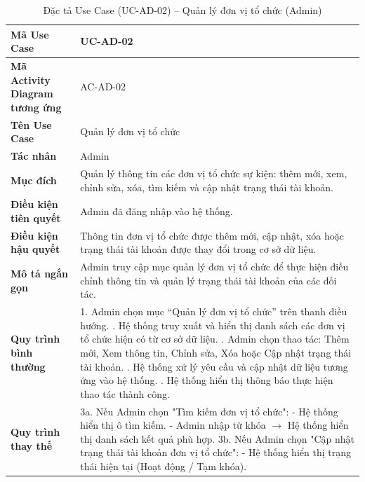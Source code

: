 \renewcommand{\arraystretch}{1.3}
\setlength{\tabcolsep}{4pt}
\begin{longtable}{|p{}|p{}|}
\caption{Đặc tả Use Case (UC-AD-02) -- Quản lý đơn vị tổ chức (Admin)}\label{tab:uc_manage_organizers}\\
\hline
\textbf{Mã Use Case} & UC-AD-02 \\ \hline
\textbf{Mã Activity Diagram tương ứng} & AC-AD-02 \\ \hline
\textbf{Tên Use Case} & Quản lý đơn vị tổ chức \\ \hline
\textbf{Tác nhân} & Admin \\ \hline
\textbf{Mục đích} & Quản lý thông tin các đơn vị tổ chức sự kiện: thêm mới, xem, chỉnh sửa, xóa, tìm kiếm và cập nhật trạng thái tài khoản. \\ \hline
\textbf{Điều kiện tiên quyết} & Admin đã đăng nhập vào hệ thống. \\ \hline
\textbf{Điều kiện hậu quyết} & Thông tin đơn vị tổ chức được thêm mới, cập nhật, xóa hoặc trạng thái tài khoản được thay đổi trong cơ sở dữ liệu. \\ \hline
\textbf{Mô tả ngắn gọn} & Admin truy cập mục quản lý đơn vị tổ chức để thực hiện điều chỉnh thông tin và quản lý trạng thái tài khoản của các đối tác. \\ \hline
\textbf{Quy trình bình thường} &
1. Admin chọn mục “Quản lý đơn vị tổ chức” trên thanh điều hướng. \newline
2. Hệ thống truy xuất và hiển thị danh sách các đơn vị tổ chức hiện có từ cơ sở dữ liệu. \newline
3. Admin chọn thao tác: Thêm mới, Xem thông tin, Chỉnh sửa, Xóa hoặc Cập nhật trạng thái tài khoản. \newline
4. Hệ thống xử lý yêu cầu và cập nhật dữ liệu tương ứng vào hệ thống. \newline
5. Hệ thống hiển thị thông báo thực hiện thao tác thành công. \\ \hline
\textbf{Quy trình thay thế} &
3a. Nếu Admin chọn "Tìm kiếm đơn vị tổ chức": \newline
- Hệ thống hiển thị ô tìm kiếm. \newline
- Admin nhập từ khóa $\rightarrow$ Hệ thống hiển thị danh sách kết quả phù hợp. \newline
3b. Nếu Admin chọn "Cập nhật trạng thái tài khoản đơn vị tổ chức": \newline
- Hệ thống hiển thị trạng thái hiện tại (Hoạt động / Tạm khóa). \newline

\end{longtable}

